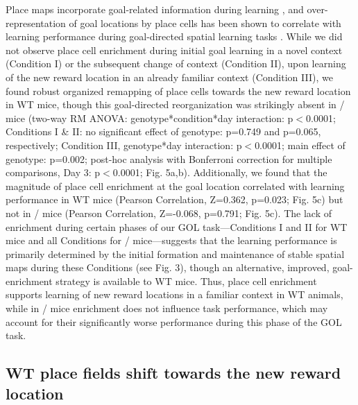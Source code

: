 Place maps incorporate goal-related information during learning \citep{Breese1989}\citep{Dupret2010b}\citep{Fyhn2002}\citep{Gothard1996}\citep{Hok2007}\citep{Hollup2001b}\citep{Kobayashi1997}, and over-representation of goal locations by place cells has been shown to correlate with learning performance during goal-directed spatial learning tasks \citep{Dupret2010a}\citep{Hollup2001b}.  While we did not observe place cell enrichment during initial goal learning in a novel context (Condition I) or the subsequent change of context (Condition II), upon learning of the new reward location in an already familiar context (Condition III), we found robust organized remapping of place cells towards the new reward location in WT mice, though this goal-directed reorganization was strikingly absent in \df/ mice (two-way RM ANOVA: genotype*condition*day interaction: p$<$0.0001; Conditions I \& II: no significant effect of genotype:  p=0.749 and p=0.065, respectively; Condition III, genotype*day interaction: p$<$0.0001; main effect of genotype: p=0.002; post-hoc analysis with Bonferroni correction for multiple comparisons, Day 3: p$<$0.0001; Fig. 5a,b).  Additionally, we found that the magnitude of place cell enrichment at the goal location correlated with learning performance in WT mice (Pearson Correlation, Z=0.362, p=0.023; Fig. 5c) but not in \df/ mice (Pearson Correlation, Z=-0.068, p=0.791; Fig. 5c). The lack of enrichment during certain phases of our GOL task—Conditions I and II for WT mice and all Conditions for \df/ mice—suggests that the learning performance is primarily determined by the initial formation and maintenance of stable spatial maps during these Conditions (see Fig. 3), though an alternative, improved, goal-enrichment strategy is available to WT mice. Thus, place cell enrichment supports learning of new reward locations in a familiar context in WT animals, while in \df/ mice enrichment does not influence task performance, which may account for their significantly worse performance during this phase of the GOL task.

\subsection{WT place fields shift towards the new reward location}

